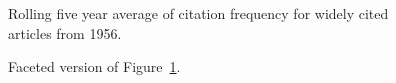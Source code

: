 \documentclass[
  10pt,
  letterpaper,
  DIV=11,
  numbers=noendperiod,
  twoside]{scrartcl}
\begin{document}
\begin{figure}


\caption{\label{fig-citation-spaghetti-1956}Rolling five year average of
citation frequency for widely cited articles from 1956.}

\end{figure}%

\begin{figure}


\caption{\label{fig-citation-facet-1956}Faceted version of
Figure~\ref{fig-citation-spaghetti-1956}.}

\end{figure}%
\end{document}
